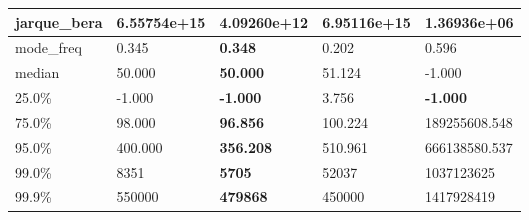 \begin{table}[H]
\begin{tabular}{|l|m{10em}|m{10em}|m{10em}|m{10em}|}
\hline jarque\_bera & 6.55754e+15 & 4.09260e+12 & \bfseries 6.95116e+15 & \cellcolor[rgb]{0.9, 0.54, 0.52} 1.36936e+06 \\
\hline mode\_freq & 0.345 & \bfseries 0.348 & 0.202 & \cellcolor[rgb]{0.9, 0.54, 0.52} 0.596 \\
\hline median & 50.000 & \bfseries 50.000 & 51.124 & \cellcolor[rgb]{0.9, 0.54, 0.52} -1.000 \\
\hline 25.0\% & -1.000 & \bfseries -1.000 & \cellcolor[rgb]{0.9, 0.54, 0.52} 3.756 & \bfseries -1.000 \\
\hline 75.0\% & 98.000 & \bfseries 96.856 & 100.224 & \cellcolor[rgb]{0.9, 0.54, 0.52} 189255608.548 \\
\hline 95.0\% & 400.000 & \bfseries 356.208 & 510.961 & \cellcolor[rgb]{0.9, 0.54, 0.52} 666138580.537 \\
\hline 99.0\% & 8351 & \bfseries 5705 & 52037 & \cellcolor[rgb]{0.9, 0.54, 0.52} 1037123625 \\
\hline 99.9\% & 550000 & \bfseries 479868 & 450000 & \cellcolor[rgb]{0.9, 0.54, 0.52} 1417928419 \\
\hline
\end{tabular}
\end{table}
